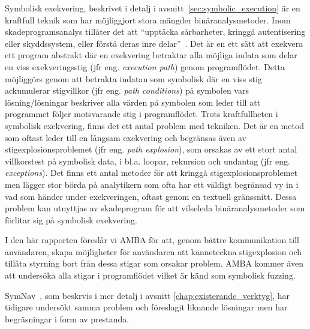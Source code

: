 Symbolisk exekvering, beskrivet i detalj i avsnitt~\ref{sec:symbolic_execution}
är en kraftfull teknik som har möjliggjort stora mängder
binäranalysmetoder\cite{survey_symb_exc, symnav}. Inom skadeprogramsanalys
tillåter det att ``upptäcka sårbarheter, kringgå autentisering eller
skyddssystem, eller förstå deras inre delar''~\cite{symnav}. Det är en ett sätt
att exekvera ett program abstrakt där en exekvering betraktar alla möjliga
indata som delar en viss exekveringsstig (jfr eng. \emph{execution path}) genom
programflödet. Detta möjliggörs genom att betrakta indatan som symbolisk där en
viss stig ackumulerar stigvillkor (jfr eng. \emph{path conditions}) på
symbolen vars lösning/lösningar beskriver alla värden på symbolen som leder
till att programmet följer motsvarande stig i programflödet. Trots
kraftfullheten i symbolisk exekvering, finns det ett antal problem med
tekniken. Det är en metod som oftast leder till en långsam exekvering och
begränsas även av stigexplosionsproblemet (jfr eng. \emph{path explosion}), som
orsakas av ett stort antal villkorstest på symbolisk data, i bl.a. loopar,
rekursion och undantag (jfr eng. \emph{exceptions}). Det finns ett antal
metoder för att kringgå stigexplosionsproblemet men lägger stor börda på
analytikern som ofta har ett väldigt begränsad vy in i vad som händer under
exekveringen, oftast genom en textuell gränssnitt. Dessa problem kan utnyttjas
av skadeprogram för att vilseleda binäranalysmetoder som förlitar sig på
symbolisk exekvering.

I den här rapporten föreslår vi AMBA för att, genom bättre kommunikation till
användaren, skapa möjligheter för användaren att känneteckna stigexplosion och
tillåta styrning bort från dessa stigar som orsakar problem. AMBA kommer även
att undersöka alla stigar i programflödet vilket är känd som symbolisk fuzzing.

SymNav~\cite{symnav}, som beskrvis i mer detalj i avsnitt
\ref{chap:existerande_verktyg}, har tidigare undersökt samma problem och
föreslagit liknande lösningar men har
begräsningar i form av prestanda.


